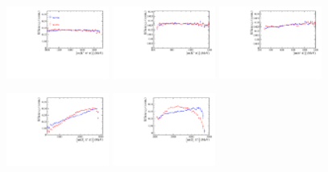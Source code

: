 \begin{figure}[h]
\centering
\includegraphics[height=!,width=0.3\textwidth]{figs/AcceptancePhsp/eff_Kpipi_trigger.pdf}
\includegraphics[height=!,width=0.3\textwidth]{figs/AcceptancePhsp/eff_Kpi_trigger.pdf}
\includegraphics[height=!,width=0.3\textwidth]{figs/AcceptancePhsp/eff_pipi_trigger.pdf}

\includegraphics[height=!,width=0.3\textwidth]{figs/AcceptancePhsp/eff_Dspipi_trigger.pdf}
\includegraphics[height=!,width=0.3\textwidth]{figs/AcceptancePhsp/eff_Dspi_trigger.pdf}


\end{figure}
